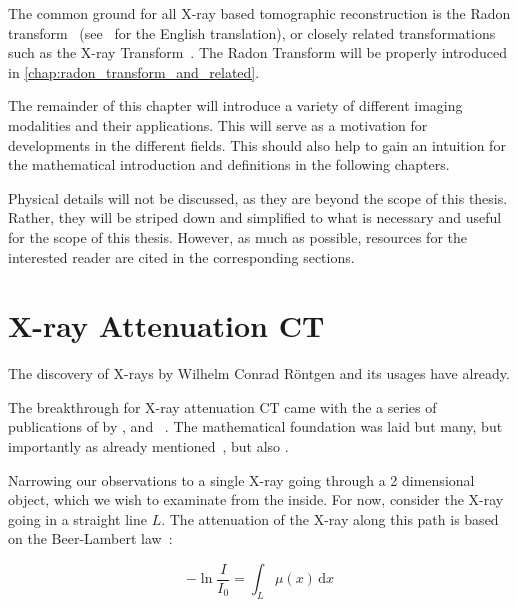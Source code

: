 The common ground for all X-ray based tomographic reconstruction is the Radon
transform~\cite{radon_uber_1917} (see~\cite{radon_determination_1986} for the English translation),
or closely related transformations such as the X-ray Transform~\cite{solmon_x-ray_1976}. The Radon
Transform will be properly introduced in \autoref{chap:radon_transform_and_related}.

The remainder of this chapter will introduce a variety of different imaging modalities and their
applications. This will serve as a motivation for developments in the different fields. This should
also help to gain an intuition for the mathematical introduction and definitions in the following
chapters.

Physical details will not be discussed, as they are beyond the scope of this thesis. Rather, they
will be striped down and simplified to what is necessary and useful for the scope of this thesis.
However, as much as possible, resources for the interested reader are cited in the corresponding
sections.


\section{X-ray Attenuation CT}\label{sec:xray_attenuation_ct}

The discovery of X-rays by Wilhelm Conrad Röntgen  and its
usages have already.

The breakthrough for X-ray attenuation CT came with the a series of publications of by
\citeauthor{hounsfield_computerized_1973}\cite{hounsfield_computerized_1973},
\citeauthor{ambrose_computerized_1973}\cite{ambrose_computerized_1973} and
~\citeauthor{perry_computerized_1973}\cite{perry_computerized_1973}. The mathematical foundation was
laid but many, but importantly as already mentioned~\citeauthor{radon_uber_1917}, but also
\citeauthor{cormack_representation_1963}\cite{cormack_representation_1963}.

Narrowing our observations to a single X-ray going through a 2 dimensional object, which we wish to
examinate from the inside. For now, consider the X-ray going in a straight line \(L\). The
attenuation of the X-ray along this path is based on the Beer-Lambert law~\cite{buzug_computed_2008}:

\begin{equation}
	\label{eq:beer-Lambert-law}
	- \ln \frac{I}{I_0} = \int_L \mu (x) \, \mathrm{d}x
\end{equation}

